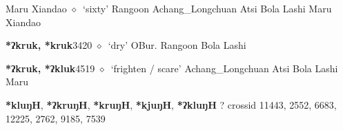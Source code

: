 \begin{list}{}{\leftmargin=1.5em \itemindent=-1.5em}
\hspace{1ex}
         Maru 
\hspace{1ex}
         Xiandao 
\hspace{1ex}
         $\diamond$~`sixty'
         Rangoon 
\hspace{1ex}
         Achang\_Longchuan 
\hspace{1ex}
         Atsi 
\hspace{1ex}
         Bola 
\hspace{1ex}
         Lashi 
\hspace{1ex}
         Maru 
\hspace{1ex}
         Xiandao 
  \item {\footnotesize \textbf{*ʔkruk, *kruk}}{\tiny 3420}
\hspace{1ex}
         $\diamond$~`dry'
         OBur. 
\hspace{1ex}
         Rangoon 
\hspace{1ex}
         Bola 
\hspace{1ex}
         Lashi 
  \item {\footnotesize \textbf{*ʔkruk, *ʔkluk}}{\tiny 4519}
\hspace{1ex}
         $\diamond$~`frighten / scare'
         Achang\_Longchuan 
\hspace{1ex}
         Atsi 
\hspace{1ex}
         Bola 
\hspace{1ex}
         Lashi 
\hspace{1ex}
         Maru 
  \end{list}
\item
\textbf{*kluŋH}, \textbf{*ʔkruŋH}, \textbf{*kruŋH}, \textbf{*kjuŋH}, \textbf{*ʔkluŋH}
?
  {\tiny crossid 11443, 2552, 6683, 12225, 2762, 9185, 7539}
